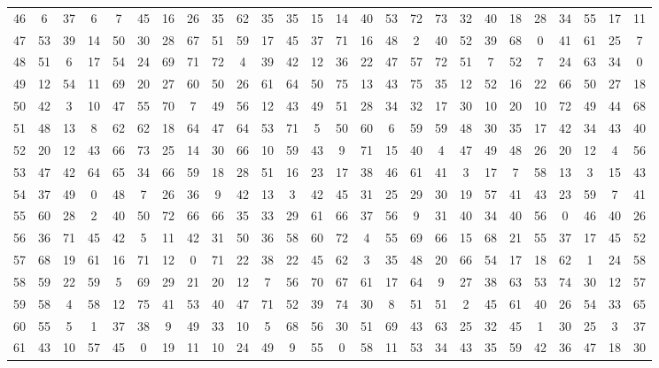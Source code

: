 \begin{table}
\begin{tabular}{c c c c c c c c c c c c c c c c c c c c c c c c c c }
46 & 6 & 37 & 6 & 7 & 45 & 16 & 26 & 35 & 62 & 35 & 35 & 15 & 14 & 40 & 53 & 72 & 73 & 32 & 40 & 18 & 28 & 34 & 55 & 17 & 11 \\
47 & 53 & 39 & 14 & 50 & 30 & 28 & 67 & 51 & 59 & 17 & 45 & 37 & 71 & 16 & 48 & 2 & 40 & 52 & 39 & 68 & 0 & 41 & 61 & 25 & 7 \\
48 & 51 & 6 & 17 & 54 & 24 & 69 & 71 & 72 & 4 & 39 & 42 & 12 & 36 & 22 & 47 & 57 & 72 & 51 & 7 & 52 & 7 & 24 & 63 & 34 & 0 \\
49 & 12 & 54 & 11 & 69 & 20 & 27 & 60 & 50 & 26 & 61 & 64 & 50 & 75 & 13 & 43 & 75 & 35 & 12 & 52 & 16 & 22 & 66 & 50 & 27 & 18 \\
50 & 42 & 3 & 10 & 47 & 55 & 70 & 7 & 49 & 56 & 12 & 43 & 49 & 51 & 28 & 34 & 32 & 17 & 30 & 10 & 20 & 10 & 72 & 49 & 44 & 68 \\
51 & 48 & 13 & 8 & 62 & 62 & 18 & 64 & 47 & 64 & 53 & 71 & 5 & 50 & 60 & 6 & 59 & 59 & 48 & 30 & 35 & 17 & 42 & 34 & 43 & 40 \\
52 & 20 & 12 & 43 & 66 & 73 & 25 & 14 & 30 & 66 & 10 & 59 & 43 & 9 & 71 & 15 & 40 & 4 & 47 & 49 & 48 & 26 & 20 & 12 & 4 & 56 \\
53 & 47 & 42 & 64 & 65 & 34 & 66 & 59 & 18 & 28 & 51 & 16 & 23 & 17 & 38 & 46 & 61 & 41 & 3 & 17 & 7 & 58 & 13 & 3 & 15 & 43 \\
54 & 37 & 49 & 0 & 48 & 7 & 26 & 36 & 9 & 42 & 13 & 3 & 42 & 45 & 31 & 25 & 29 & 30 & 19 & 57 & 41 & 43 & 23 & 59 & 7 & 41 \\
55 & 60 & 28 & 2 & 40 & 50 & 72 & 66 & 66 & 35 & 33 & 29 & 61 & 66 & 37 & 56 & 9 & 31 & 40 & 34 & 40 & 56 & 0 & 46 & 40 & 26 \\
56 & 36 & 71 & 45 & 42 & 5 & 11 & 42 & 31 & 50 & 36 & 58 & 60 & 72 & 4 & 55 & 69 & 66 & 15 & 68 & 21 & 55 & 37 & 17 & 45 & 52 \\
57 & 68 & 19 & 61 & 16 & 71 & 12 & 0 & 71 & 22 & 38 & 22 & 45 & 62 & 3 & 35 & 48 & 20 & 66 & 54 & 17 & 18 & 62 & 1 & 24 & 58 \\
58 & 59 & 22 & 59 & 5 & 69 & 29 & 21 & 20 & 12 & 7 & 56 & 70 & 67 & 61 & 17 & 64 & 9 & 27 & 38 & 63 & 53 & 74 & 30 & 12 & 57 \\
59 & 58 & 4 & 58 & 12 & 75 & 41 & 53 & 40 & 47 & 71 & 52 & 39 & 74 & 30 & 8 & 51 & 51 & 2 & 45 & 61 & 40 & 26 & 54 & 33 & 65 \\
60 & 55 & 5 & 1 & 37 & 38 & 9 & 49 & 33 & 10 & 5 & 68 & 56 & 30 & 51 & 69 & 43 & 63 & 25 & 32 & 45 & 1 & 30 & 25 & 3 & 37 \\
61 & 43 & 10 & 57 & 45 & 0 & 19 & 11 & 10 & 24 & 49 & 9 & 55 & 0 & 58 & 11 & 53 & 34 & 43 & 35 & 59 & 42 & 36 & 47 & 18 & 30 \\

\end{tabular}
\end{table}
